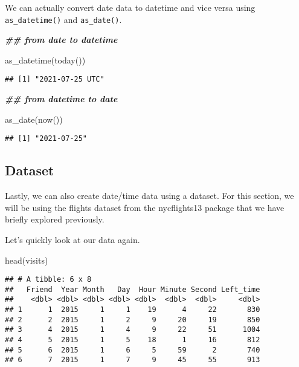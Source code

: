 \documentclass[
]{book}
\newenvironment{Shaded}{\begin{snugshade}}{\end{snugshade}}
\newcommand{\DocumentationTok}[1]{\textcolor[rgb]{0.56,0.35,0.01}{\textbf{\textit{#1}}}}
\newcommand{\FunctionTok}[1]{\textcolor[rgb]{0.00,0.00,0.00}{#1}}
\newcommand{\NormalTok}[1]{#1}
\begin{document}
We can actually convert date data to datetime and vice versa using \texttt{as\_datetime()} and \texttt{as\_date()}.

\begin{Shaded}
\begin{Highlighting}[]
\DocumentationTok{\#\# from date to datetime}

\FunctionTok{as\_datetime}\NormalTok{(}\FunctionTok{today}\NormalTok{())}
\end{Highlighting}
\end{Shaded}

\begin{verbatim}
## [1] "2021-07-25 UTC"
\end{verbatim}

\begin{Shaded}
\begin{Highlighting}[]
\DocumentationTok{\#\# from datetime to date}

\FunctionTok{as\_date}\NormalTok{(}\FunctionTok{now}\NormalTok{())}
\end{Highlighting}
\end{Shaded}

\begin{verbatim}
## [1] "2021-07-25"
\end{verbatim}

\hypertarget{dataset}{%
\subsection{Dataset}\label{dataset}}

Lastly, we can also create date/time data using a dataset. For this section, we will be using the flights dataset from the nycflights13 package that we have briefly explored previously.

Let's quickly look at our data again.

\begin{Shaded}
\begin{Highlighting}[]
\FunctionTok{head}\NormalTok{(visits)}
\end{Highlighting}
\end{Shaded}

\begin{verbatim}
## # A tibble: 6 x 8
##   Friend  Year Month   Day  Hour Minute Second Left_time
##    <dbl> <dbl> <dbl> <dbl> <dbl>  <dbl>  <dbl>     <dbl>
## 1      1  2015     1     1    19      4     22       830
## 2      2  2015     1     2     9     20     19       850
## 3      4  2015     1     4     9     22     51      1004
## 4      5  2015     1     5    18      1     16       812
## 5      6  2015     1     6     5     59      2       740
## 6      7  2015     1     7     9     45     55       913
\end{verbatim}
\end{document}
